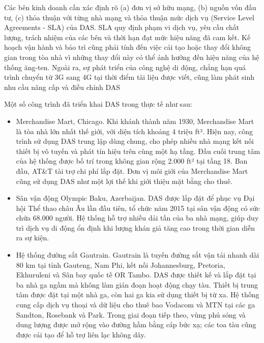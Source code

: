 \documentclass{thesis}
\begin{document}
Các bên kinh doanh cần xác định rõ (a) đơn vị sở hữu mạng, (b) nguồn
vốn đầu tư, (c) thỏa thuận với từng nhà mạng và thỏa thuận mức dịch
vụ (Service Level Agreements - SLA) của DAS. SLA quy định phạm vi
dịch vụ, yêu cầu chất lượng,
trách nhiệm của các bên và thời hạn đạt mức hiệu năng đã cam kết. Kế
hoạch vận hành và bảo trì cũng phải tính đến việc cải tạo hoặc thay
đổi không gian trong tòa nhà vì những thay đổi này có thể ảnh hưởng
đến hiệu năng của hệ thống ăng-ten. Ngoài ra, sự phát triển của công
nghệ di động, chẳng hạn quá trình chuyển từ 3G sang 4G tại thời điểm
tài liệu được viết, cũng làm phát sinh nhu cầu nâng cấp và điều chỉnh DAS

Một số công trình đã triển khai DAS trong thực tế như sau:

\begin{itemize}
  \item Merchandise Mart, Chicago. Khi khánh thành năm 1930,
    Merchandise Mart là tòa nhà lớn nhất thế giới, với diện tích
    khoảng 4 triệu ft². Hiện nay, công trình sử dụng DAS trung lập
    dùng chung, cho phép nhiều nhà mạng kết nối thiết bị vô tuyến và
    phát tín hiệu trên cùng một hạ tầng. Đầu cuối trung tâm của hệ
    thống được bố trí trong không gian rộng 2.000 ft² tại tầng 18.
    Ban đầu, AT\&T tài trợ chi phí lắp đặt. Đơn vị môi giới của
    Merchandise Mart cũng sử dụng DAS như một lợi thế khi giới thiệu
    mặt bằng cho thuê.
  \item Sân vận động Olympic Baku, Azerbaijan. DAS được lắp đặt để phục
    vụ Đại hội Thể thao châu Âu lần đầu tiên, tổ chức năm 2015 tại sân
    vận động có sức chứa 68.000 người. Hệ thống hỗ trợ nhiều dải tần của
    ba nhà mạng, giúp duy trì dịch vụ di động ổn định khi lượng khán giả
    tăng cao trong thời gian diễn ra sự kiện.
  \item Hệ thống đường sắt Gautrain. Gautrain là tuyến đường sắt vận tải
    nhanh dài 80 km tại tỉnh Gauteng, Nam Phi, kết nối Johannesburg,
    Pretoria, Ekhuruleni và Sân bay quốc tế OR Tambo. DAS được thiết kế
    và lắp đặt tại ba nhà ga ngầm mà không làm gián đoạn hoạt động chạy
    tàu. Thiết bị trung tâm được đặt tại một nhà ga, còn hai ga kia sử
    dụng thiết bị từ xa. Hệ thống cung cấp dịch vụ thoại và dữ liệu cho
    thuê bao Vodacom và MTN tại các ga Sandton, Rosebank và Park. Trong
    giai đoạn tiếp theo, vùng phủ sóng và dung lượng được mở rộng vào
    đường hầm bằng cáp bức xạ; các toa tàu cũng được cải tạo để hỗ trợ
    liên lạc không dây.
\end{itemize}
\end{document}
